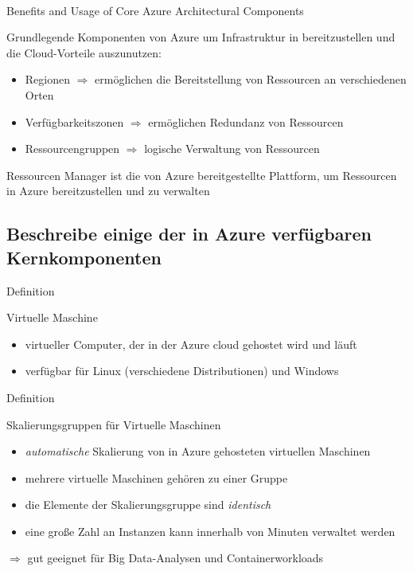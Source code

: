 \documentclass{scrartcl}
\newenvironment{flashcard}[2][]{%
    #1
    \vfill
    \centerline{\Large{#2}}
    \vfill
\newpage
}
{\newpage}
\newcommand{\subsectioncard}[1]{
    \vspace*{\stretch{1}}
    \subsection{#1}
    \vspace*{\stretch{1}}
    \pagebreak
}
\begin{document}
    \begin{flashcard}[\ ]{Benefits and Usage of Core Azure Architectural Components}
        Grundlegende Komponenten von Azure um Infrastruktur in bereitzustellen und die Cloud-Vorteile auszunutzen:
        \begin{itemize}
            \item Regionen $\Rightarrow$ ermöglichen die Bereitstellung von Ressourcen an verschiedenen Orten
            \item Verfügbarkeitszonen $\Rightarrow$ ermöglichen Redundanz von Ressourcen
            \item Ressourcengruppen $\Rightarrow$ logische Verwaltung von Ressourcen
        \end{itemize}

        \vspace{5mm}
        Ressourcen Manager ist die von Azure bereitgestellte Plattform, um Ressourcen in Azure bereitzustellen und zu verwalten

    \end{flashcard}

    \subsectioncard{Beschreibe einige der in Azure verfügbaren Kernkomponenten}

    \begin{flashcard}[Definition]{Virtuelle Maschine}
        \begin{itemize}
            \item virtueller Computer, der in der Azure cloud gehostet wird und läuft
            \item verfügbar für Linux (verschiedene Distributionen) und Windows
        \end{itemize}
    \end{flashcard}

    \begin{flashcard}[Definition]{Skalierungsgruppen für Virtuelle Maschinen}
        \begin{itemize}
            \item \emph{automatische} Skalierung von in Azure gehosteten virtuellen Maschinen
            \item mehrere virtuelle Maschinen gehören zu einer Gruppe
            \item die Elemente der Skalierungsgruppe sind \emph{identisch}
            \item eine große Zahl an Instanzen kann innerhalb von Minuten verwaltet werden
        \end{itemize}
        $\Rightarrow$ gut geeignet für Big Data-Analysen und Containerworkloads

    \end{flashcard}
\end{document}
